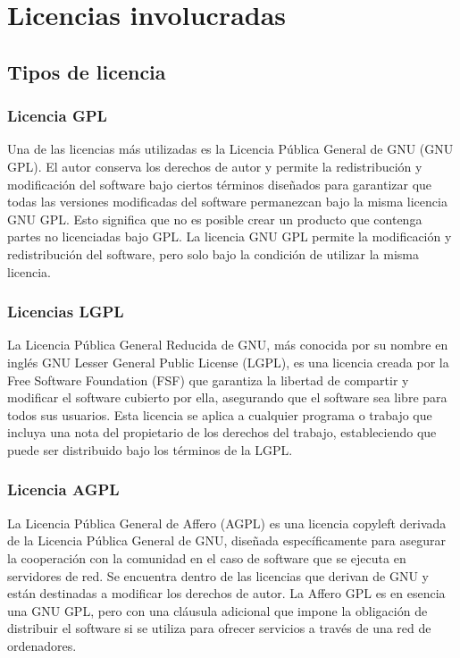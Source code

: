 	\chapter{Licencias involucradas}\label{ch:licencias}

	\section{Tipos de licencia}\vspace{0.6cm}

			\subsection{Licencia GPL}\label{gpl}
			
				Una de las licencias más utilizadas es la Licencia Pública General de GNU (GNU GPL). El autor conserva los derechos de autor y permite la redistribución y modificación del software bajo ciertos términos diseñados para garantizar que todas las versiones modificadas del software permanezcan bajo la misma licencia GNU GPL. Esto significa que no es posible crear un producto que contenga partes no licenciadas bajo GPL. La licencia GNU GPL permite la modificación y redistribución del software, pero solo bajo la condición de utilizar la misma licencia.\par
				
	
	
			\subsection{Licencias LGPL}\label{lgpl}
				
				La Licencia Pública General Reducida de GNU, más conocida por su nombre en inglés GNU Lesser General Public License (LGPL), es una licencia creada por la Free Software Foundation (FSF) que garantiza la libertad de compartir y modificar el software cubierto por ella, asegurando que el software sea libre para todos sus usuarios. Esta licencia se aplica a cualquier programa o trabajo que incluya una nota del propietario de los derechos del trabajo, estableciendo que puede ser distribuido bajo los términos de la LGPL.\par
			
			\subsection{Licencia AGPL}\label{agpl}
			
				La Licencia Pública General de Affero (AGPL) es una licencia copyleft derivada de la Licencia Pública General de GNU, diseñada específicamente para asegurar la cooperación con la comunidad en el caso de software que se ejecuta en servidores de red. Se encuentra dentro de las licencias que derivan de GNU y están destinadas a modificar los derechos de autor. La Affero GPL es en esencia una GNU GPL, pero con una cláusula adicional que impone la obligación de distribuir el software si se utiliza para ofrecer servicios a través de una red de ordenadores.

